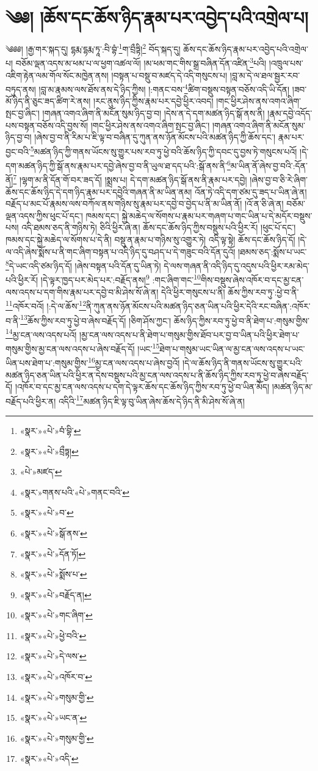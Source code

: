 \chapter{༄༅། །ཆོས་དང་ཆོས་ཉིད་རྣམ་པར་འབྱེད་པའི་འགྲེལ་པ།}༄༅༅། །རྒྱ་གར་སྐད་དུ། དྷརྨ་དྷརྨ་ཏཱ་:བི་བྷཾ་\footnote{«སྣར་»«པེ་»བཾ་བྷི་}ག་བྲྀཏྟི།\footnote{«སྣར་»«པེ་»བྲྀཏྟ།} བོད་སྐད་དུ། ཆོས་དང་ཆོས་ཉིད་རྣམ་པར་འབྱེད་པའི་འགྲེལ་པ། བཅོམ་ལྡན་འདས་མ་ཕམ་པ་ལ་ཕྱག་འཚལ་ལོ། །མ་ཕམ་གང་གིས་སྒྲ་བཞིན་དོན་འཛིན་\footnote{«པེ་»མཛད་}པའི། །འཁྲུལ་པས་འཇིག་རྟེན་ལམ་གོལ་སོང་མཁྱེན་ནས། །བསྟན་པ་བསྡུ་བ་མཛད་དེ་འདི་གསུངས་པ། །བླ་མ་དེ་ལ་ཐལ་སྦྱར་རབ་བཏུད་ནས། །བླ་མ་རྣམས་ལས་ཐོས་ནས་དེ་ཉིད་ཀྱིས། །:གནང་བས་\footnote{«སྣར་»གནས་པའི་«པེ་»གནང་བའི་}ཚིག་བསྡུས་བསྟན་བཅོས་འདི་ཡི་དོན། །ཟབ་མོ་ཉིད་ནི་ཅུང་ཟད་ཚིག་རེ་ནས། །རང་ནུས་ཉིད་ཀྱིས་རྣམ་པར་དབྱེ་ཕྱིར་འབད། །གང་ཕྱིར་ཤེས་ནས་འགའ་ཞིག་སྤང་བྱ་ཞིང་། །གཞན་འགའ་ཞིག་ནི་མངོན་སུམ་ཉིད་བྱ་བ། །དེས་ན་དེ་དག་མཚན་ཉིད་སྒོ་ནས་ནི། །རྣམ་དབྱེ་འདོད་པས་བསྟན་བཅོས་འདི་བྱས་སོ། །གང་ཕྱིར་ཤེས་ནས་འགའ་ཞིག་སྤང་བྱ་ཞིང་། །གཞན་འགའ་ཞིག་ནི་མངོན་སུམ་ཉིད་བྱ་བ། །ཞེས་བྱ་བ་ནི་རིམ་པ་ཇི་ལྟ་བ་བཞིན་དུ་ཀུན་ནས་ཉོན་མོངས་པའི་མཚན་ཉིད་ཀྱི་ཆོས་དང་། རྣམ་པར་བྱང་བའི་\footnote{«སྣར་»«པེ་»བ་}མཚན་ཉིད་ཀྱི་གནས་ཡོངས་སུ་གྱུར་པས་རབ་ཏུ་ཕྱེ་བའི་ཆོས་ཉིད་ཀྱི་དབང་དུ་བྱས་ཏེ་གསུངས་པའོ། །དེ་དག་མཚན་ཉིད་ཀྱི་སྒོ་ནས་རྣམ་པར་དབྱེ་ཞེས་བྱ་བ་ནི་ཡུལ་ཐ་དད་པའི་:སྒོ་ནས་ནི་\footnote{«སྣར་»«པེ་»སྒོ་ནས་}མ་ཡིན་ནོ་ཞེས་བྱ་བའི་:དོན་ནོ།\footnote{«སྣར་»«པེ་»དོན་ཏོ།} །ལྷག་མ་ནི་དོན་གོ་བར་ཟད་དོ། །སྨྲས་པ། དེ་དག་མཚན་ཉིད་སྒོ་ནས་ནི་རྣམ་པར་དབྱེ། །ཞེས་བྱ་བ་ཅི་རེ་ཞིག་ཆོས་དང་ཆོས་ཉིད་དེ་དག་ཉིད་རྣམ་པར་དབྱེའི་གཞན་ནི་མ་ཡིན་ནམ། འོན་ཏེ་འདི་དག་ཙམ་དུ་ཟད་པ་ཡིན་ཞེ་ན། བརྗོད་པ་མང་པོ་རྣམས་ལས་བཀོལ་ནས་གཉིས་སུ་རྣམ་པར་དབྱེ་བ་བྱེད་པ་ནི་མ་ཡིན་ནོ། །འོ་ན་ཅི་ཞེ་ན། བཅོམ་ལྡན་འདས་ཀྱིས་ཕུང་པོ་དང་། ཁམས་དང་། སྐྱེ་མཆེད་ལ་སོགས་པ་རྣམ་པར་གཞག་པ་གང་ཡིན་པ་དེ་མདོར་བསྡུས་པས། འདི་ཐམས་ཅད་ནི་གཉིས་ཏེ། ཅིའི་ཕྱིར་ཞེ་ན། ཆོས་དང་ཆོས་ཉིད་ཀྱིས་བསྡུས་པའི་ཕྱིར་རོ། །ཕུང་པོ་དང་། ཁམས་དང་སྐྱེ་མཆེད་ལ་སོགས་པ་དེ་ནི། བསྡུ་ན་རྣམ་པ་གཉིས་སུ་འགྱུར་ཏེ། འདི་ལྟ་སྟེ། ཆོས་དང་ཆོས་ཉིད་དོ། །དེ་ལ་འདི་ཞེས་སྨོས་པ་ནི་གང་ཞིག་བསྟན་པ་འདི་ཉིད་དུ་བཤད་པ་དེ་གཟུང་བའི་དོན་དུའོ། །ཐམས་ཅད་:སྨོས་པ་ཡང་\footnote{«སྣར་»«པེ་»སྨོས་པ་}དེ་ཡང་འདི་ཙམ་ཉིད་དོ། །ཞེས་བསྟན་པའི་དོན་དུ་ཡིན་ཏེ། དེ་ལས་གཞན་ནི་འདི་ཉིད་དུ་འདུས་པའི་ཕྱིར་རམ་མེད་པའི་ཕྱིར་རོ། །དེ་ལྟར་ཁྱད་པར་མེད་པར་:བརྗོད་ནས།\footnote{«སྣར་»«པེ་»བརྗོད་ན།} :གང་ཞིག་གང་\footnote{«སྣར་»«པེ་»གང་ཞིག་}གིས་བསྡུས་ཞེས་འཁོར་བ་དང་མྱ་ངན་ལས་འདས་པ་དག་གིས་རྣམ་པར་དབྱེ་བ་མི་ཤེས་སོ་ཞེ་ན། དེའི་ཕྱིར་གསུངས་པ་ནི། ཆོས་ཀྱིས་རབ་ཏུ་:ཕྱེ་བ་ནི་\footnote{«སྣར་»«པེ་»ཕྱེ་བའི་}འཁོར་བའོ། །:དེ་ལ་ཆོས་\footnote{«སྣར་»«པེ་»དེ་ལས་}ནི་ཀུན་ནས་ཉོན་མོངས་པའི་མཚན་ཉིད་ཅན་ཡིན་པའི་ཕྱིར་དེའི་རང་བཞིན་:འཁོར་བ་ནི་\footnote{«སྣར་»«པེ་»འཁོར་བ་}ཆོས་ཀྱིས་རབ་ཏུ་ཕྱེ་བ་ཞེས་བརྗོད་དོ། །ཅིག་ཤོས་ཀྱང་། ཆོས་ཉིད་ཀྱིས་རབ་ཏུ་ཕྱེ་བ་ནི་ཐེག་པ་:གསུམ་གྱིས་\footnote{«སྣར་»«པེ་»གསུམ་གྱི་}མྱ་ངན་ལས་འདས་པའོ། །མྱ་ངན་ལས་འདས་པ་ནི་ཐེག་པ་གསུམ་གྱིས་ཐོབ་པར་བྱ་བ་ཡིན་པའི་ཕྱིར་ཐེག་པ་གསུམ་གྱིས་མྱ་ངན་ལས་འདས་པ་ཞེས་བརྗོད་དོ། །ཡང་\footnote{«སྣར་»«པེ་»ཡང་ན་}ཐེག་པ་གསུམ་ཡང་ཡིན་ལ་མྱ་ངན་ལས་འདས་པ་ཡང་ཡིན་པས་ཐེག་པ་:གསུམ་གྱིས་\footnote{«སྣར་»«པེ་»གསུམ་གྱི་}མྱ་ངན་ལས་འདས་པ་ཞེས་བྱའོ། །དེ་ལ་ཆོས་ཉིད་ནི་གནས་ཡོངས་སུ་གྱུར་པའི་མཚན་ཉིད་ཅན་ཡིན་པའི་ཕྱིར་ན་དེས་བསྡུས་པའི་མྱ་ངན་ལས་འདས་པ་ནི་ཆོས་ཉིད་ཀྱིས་རབ་ཏུ་ཕྱེ་བ་ཞེས་བརྗོད་དོ། །འཁོར་བ་དང་མྱ་ངན་ལས་འདས་པ་དག་དེ་ལྟར་ཆོས་དང་ཆོས་ཉིད་ཀྱིས་རབ་ཏུ་ཕྱེ་བ་ཡིན་མོད། །མཚན་ཉིད་མ་བརྗོད་པའི་ཕྱིར་ན། འདིའི་\footnote{«སྣར་»«པེ་»འདི་}མཚན་ཉིད་ཇི་ལྟ་བུ་ཡིན་ཞེས་ཆོས་དེ་ཉིད་ནི་མི་ཤེས་སོ་ཞེ་ན། 